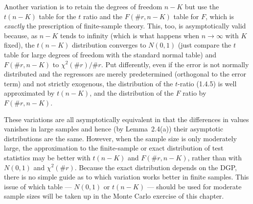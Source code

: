Another variation is to retain the degrees of freedom $n - K$ but use the $t(n - K)$
table for the $t$ ratio and the $F(\#r, n - K)$ table for $F$, which is \emph{exactly}
the prescription of finite-sample theory.  This, too, is asymptotically valid because, as
$n - K$ tends to infinity (which is what happens when $n \to \infty$ with $K$ fixed),
the $t(n - K)$ distribution converges to $N(0,1)$ (just compare the $t$ table for large
degrees of freedom with the standard normal table) and $F(\#r, n - K)$ to
$\chi^2(\#r)/\#r$.  Put differently, even if the error is not normally distributed and the
regressors are merely predetermined (orthogonal to the error term) and not strictly
exogenous, the distribution of the $t$-ratio (1.4.5) is well approximated by $t(n - K)$,
and the distribution of the $F$ ratio by $F(\#r, n - K)$.

These variations are all asymptotically equivalent in that the differences in values
vanishes in large samples and hence (by Lemma~2.4(a)) their asymptotic distributions are
the same.  However, when the sample size is only moderately large, the approximation to
the finite-sample or exact distribution of test statistics may be better with $t(n - K)$
and $F(\#r, n - K)$, rather than with $N(0,1)$ and $\chi^2(\#r)$.  Because the exact
distribution depends on the DGP, there is no simple guide as to which variation works
better in finite samples.  This issue of which table --- $N(0,1)$
or $t(n - K)$ --- should be used for moderate sample sizes will be taken up in the
Monte Carlo exercise of this chapter.
